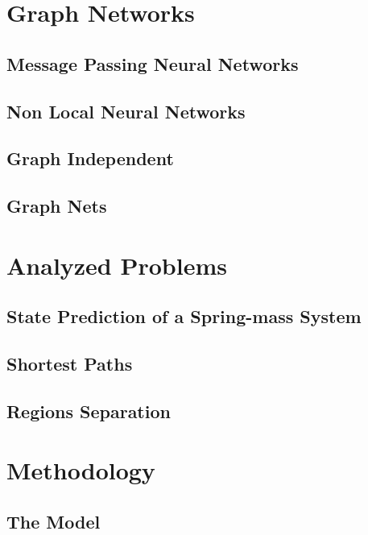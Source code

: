 \section{Graph Networks}

\subsection{Message Passing Neural Networks}

\subsection{Non Local Neural Networks}

\subsection{Graph Independent}

\subsection{Graph Nets}




\section{Analyzed Problems}


\subsection{State Prediction of a Spring-mass System}


\subsection{Shortest Paths}


\subsection{Regions Separation}




\section{Methodology}


\subsection{The Model}


